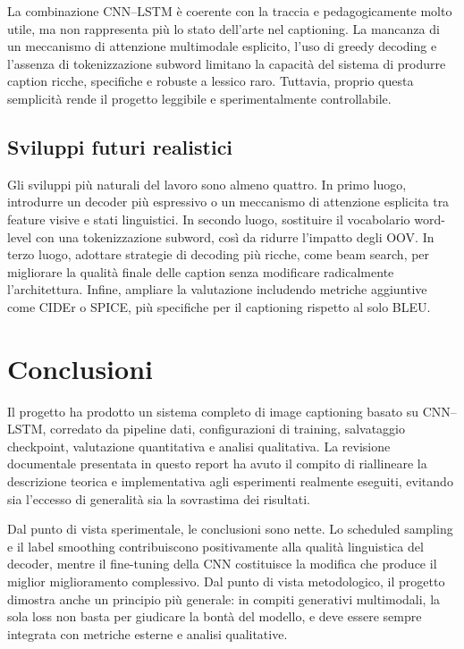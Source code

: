 \documentclass[11pt,a4paper]{report}
\begin{document}
La combinazione CNN--LSTM è coerente con la traccia e pedagogicamente molto utile, ma non rappresenta più lo stato dell'arte nel captioning. La mancanza di un meccanismo di attenzione multimodale esplicito, l'uso di greedy decoding e l'assenza di tokenizzazione subword limitano la capacità del sistema di produrre caption ricche, specifiche e robuste a lessico raro. Tuttavia, proprio questa semplicità rende il progetto leggibile e sperimentalmente controllabile.

\section{Sviluppi futuri realistici}

Gli sviluppi più naturali del lavoro sono almeno quattro. In primo luogo, introdurre un decoder più espressivo o un meccanismo di attenzione esplicita tra feature visive e stati linguistici. In secondo luogo, sostituire il vocabolario word-level con una tokenizzazione subword, così da ridurre l'impatto degli OOV. In terzo luogo, adottare strategie di decoding più ricche, come beam search, per migliorare la qualità finale delle caption senza modificare radicalmente l'architettura. Infine, ampliare la valutazione includendo metriche aggiuntive come CIDEr o SPICE, più specifiche per il captioning rispetto al solo BLEU.

\chapter{Conclusioni}

Il progetto ha prodotto un sistema completo di image captioning basato su CNN--LSTM, corredato da pipeline dati, configurazioni di training, salvataggio checkpoint, valutazione quantitativa e analisi qualitativa. La revisione documentale presentata in questo report ha avuto il compito di riallineare la descrizione teorica e implementativa agli esperimenti realmente eseguiti, evitando sia l'eccesso di generalità sia la sovrastima dei risultati.

Dal punto di vista sperimentale, le conclusioni sono nette. Lo scheduled sampling e il label smoothing contribuiscono positivamente alla qualità linguistica del decoder, mentre il fine-tuning della CNN costituisce la modifica che produce il miglior miglioramento complessivo. Dal punto di vista metodologico, il progetto dimostra anche un principio più generale: in compiti generativi multimodali, la sola loss non basta per giudicare la bontà del modello, e deve essere sempre integrata con metriche esterne e analisi qualitative.
\end{document}

